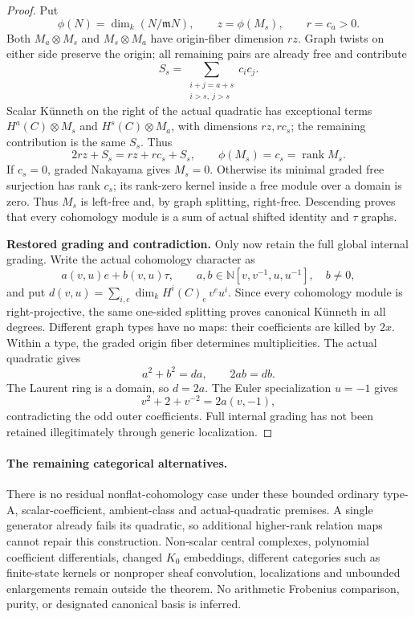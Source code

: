 \begin{proof}
Put
\[
 \phi(N)=\dim_k(N/\mathfrak mN),\qquad
 z=\phi(M_s),\qquad r=c_a>0.
\]
Both \(M_a\otimes M_s\) and \(M_s\otimes M_a\)
have origin-fiber dimension \(rz\).
Graph twists on either side preserve the origin;
all remaining pairs are already free and contribute
\[
 S_s=\sum_{\substack{i+j=a+s\\i>s,\ j>s}}c_i c_j.
\]
Scalar K\"unneth on the right of the actual quadratic
has exceptional terms \(H^a(C)\otimes M_s\) and
\(H^s(C)\otimes M_a\), with dimensions \(rz,rc_s\);
the remaining contribution is the same \(S_s\).
Thus
\[
 2rz+S_s=rz+rc_s+S_s,\qquad
 \phi(M_s)=c_s=\operatorname{rank}M_s.
\]
If \(c_s=0\), graded Nakayama gives \(M_s=0\).
Otherwise its minimal graded free surjection has
rank \(c_s\); its rank-zero kernel inside a free
module over a domain is zero. Thus \(M_s\) is
left-free and, by graph splitting, right-free.
Descending proves that every cohomology module is
a sum of actual shifted identity and \(\tau\) graphs.

\par\smallskip\noindent\textbf{Restored grading and contradiction.}\quad
Only now retain the full global internal grading.
Write the actual cohomology character as
\[
 a(v,u)e+b(v,u)\tau,\qquad
 a,b\in\mathbb N[v,v^{-1},u,u^{-1}],\quad b\ne0,
\]
and put \(d(v,u)=\sum_{i,e}\dim_kH^i(C)_e\,v^eu^i\).
Since every cohomology module is right-projective,
the same one-sided splitting proves canonical
K\"unneth in all degrees. Different graph types
have no maps: their coefficients are killed by
\(2x\). Within a type, the graded origin fiber
determines multiplicities. The actual quadratic gives
\[
                         a^2+b^2=da,\qquad2ab=db.
\]
The Laurent ring is a domain, so \(d=2a\).
The Euler specialization \(u=-1\) gives
\[
                       v^2+2+v^{-2}=2a(v,-1),
\]
contradicting the odd outer coefficients.
Full internal grading has not been retained
illegitimately through generic localization.
\end{proof}

\paragraph{The remaining categorical alternatives.}
There is no residual nonflat-cohomology case under
these bounded ordinary type-A, scalar-coefficient,
ambient-class and actual-quadratic premises.
A single generator already fails its quadratic,
so additional higher-rank relation maps cannot
repair this construction.
Non-scalar central complexes, polynomial coefficient
differentials, changed \(K_0\) embeddings, different
categories such as finite-state kernels or nonproper
sheaf convolution, localizations and unbounded
enlargements remain outside the theorem.
No arithmetic Frobenius comparison, purity, or
designated canonical basis is inferred.

